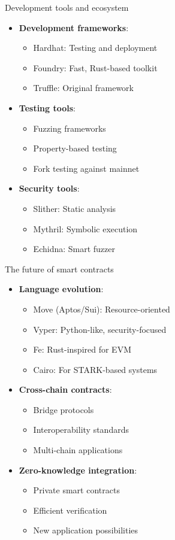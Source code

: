 \documentclass[aspectratio=169, lualatex, handout]{beamer}
\begin{document}
\begin{frame}{Development tools and ecosystem}
	\begin{itemize}
		\item \textbf{Development frameworks}:
		      \begin{itemize}
			      \item Hardhat: Testing and deployment
			      \item Foundry: Fast, Rust-based toolkit
			      \item Truffle: Original framework
		      \end{itemize}
		\item \textbf{Testing tools}:
		      \begin{itemize}
			      \item Fuzzing frameworks
			      \item Property-based testing
			      \item Fork testing against mainnet
		      \end{itemize}
		\item \textbf{Security tools}:
		      \begin{itemize}
			      \item Slither: Static analysis
			      \item Mythril: Symbolic execution
			      \item Echidna: Smart fuzzer
		      \end{itemize}
	\end{itemize}
\end{frame}

\begin{frame}{The future of smart contracts}
	\begin{itemize}
		\item \textbf{Language evolution}:
		      \begin{itemize}
			      \item Move (Aptos/Sui): Resource-oriented
			      \item Vyper: Python-like, security-focused
			      \item Fe: Rust-inspired for EVM
			      \item Cairo: For STARK-based systems
		      \end{itemize}
		\item \textbf{Cross-chain contracts}:
		      \begin{itemize}
			      \item Bridge protocols
			      \item Interoperability standards
			      \item Multi-chain applications
		      \end{itemize}
		\item \textbf{Zero-knowledge integration}:
		      \begin{itemize}
			      \item Private smart contracts
			      \item Efficient verification
			      \item New application possibilities
		      \end{itemize}
	\end{itemize}
\end{frame}
\end{document}
